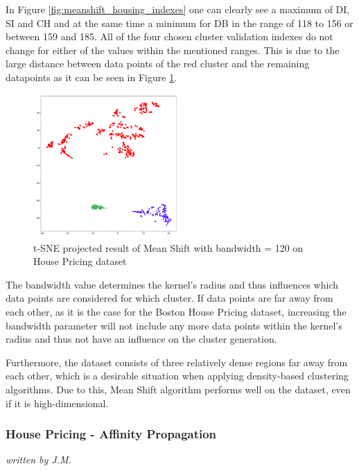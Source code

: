 In Figure \ref{fig:meanshift_housing_indexes} one can clearly see a maximum of DI, SI and CH and at the same time a minimum for DB in the range of 118 to 156 or between 159 and 185. All of the four chosen cluster validation indexes do not change for either of the values within the mentioned ranges. This is due to the large distance between data points of the red cluster and the remaining datapoints as it can be seen in Figure \ref{fig:meanshift_housing_120}.

\begin{figure}[!ht]
\begin{center}
\includegraphics[width=0.5\textwidth]{images/Meanshift_Housing_120.png}
\caption{t-SNE projected result of Mean Shift with bandwidth = 120 on House Pricing dataset}
\end{center}
\label{fig:meanshift_housing_120}
\end{figure}

The bandwidth value determines the kernel's radius and thus influences which data points are considered for which cluster. If data points are far away from each other, as it is the case for the Boston House Pricing dataset, increasing the bandwidth parameter will not include any more data points within the kernel's radius and thus not have an influence on the cluster generation. 

Furthermore, the dataset consists of three relatively dense regions far away from each other, which is a desirable situation when applying density-based clustering algorithms. Due to this, Mean Shift algorithm performs well on the dataset, even if it is high-dimensional.

\subsubsection{House Pricing - Affinity Propagation}
\textit{written by J.M.}\\

